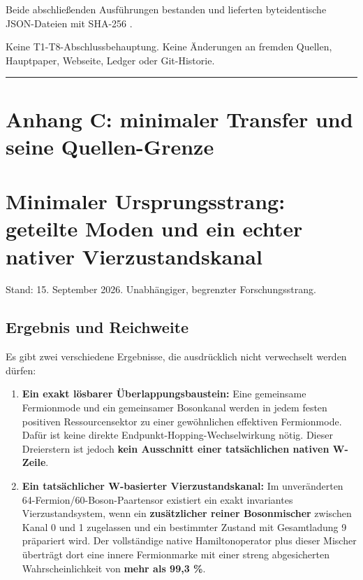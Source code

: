 Beide abschließenden Ausführungen bestanden und lieferten byteidentische
JSON-Dateien mit SHA-256
.

Keine T1-T8-Abschlussbehauptung. Keine Änderungen an fremden Quellen,
Hauptpaper, Webseite, Ledger oder Git-Historie.

\begin{center}\rule{0.5\linewidth}{0.5pt}\end{center}

\section{Anhang C: minimaler Transfer und seine
Quellen-Grenze}\label{anhang-c-minimaler-transfer-und-seine-quellen-grenze}

\section{Minimaler Ursprungsstrang: geteilte Moden und ein echter
nativer
Vierzustandskanal}\label{minimaler-ursprungsstrang-geteilte-moden-und-ein-echter-nativer-vierzustandskanal}

Stand: 15. September 2026. Unabhängiger, begrenzter Forschungsstrang.

\subsection{Ergebnis und Reichweite}\label{ergebnis-und-reichweite}

Es gibt zwei verschiedene Ergebnisse, die ausdrücklich nicht verwechselt
werden dürfen:

\begin{enumerate}
\def\labelenumi{\arabic{enumi}.}
\tightlist
\item
  \textbf{Ein exakt lösbarer Überlappungsbaustein:} Eine gemeinsame
  Fermionmode und ein gemeinsamer Bosonkanal werden in jedem festen
  positiven Ressourcensektor zu einer gewöhnlichen effektiven
  Fermionmode. Dafür ist keine direkte Endpunkt-Hopping-Wechselwirkung
  nötig. Dieser Dreierstern ist jedoch \textbf{kein Ausschnitt einer
  tatsächlichen nativen W-Zeile}.
\item
  \textbf{Ein tatsächlicher W-basierter Vierzustandskanal:} Im
  unveränderten 64-Fermion/60-Boson-Paartensor existiert ein exakt
  invariantes Vierzustandsystem, wenn ein \textbf{zusätzlicher reiner
  Bosonmischer} zwischen Kanal 0 und 1 zugelassen und ein bestimmter
  Zustand mit Gesamtladung 9 präpariert wird. Der vollständige native
  Hamiltonoperator plus dieser Mischer überträgt dort eine innere
  Fermionmarke mit einer streng abgesicherten Wahrscheinlichkeit von
  \textbf{mehr als 99,3 \%}.
\end{enumerate}

